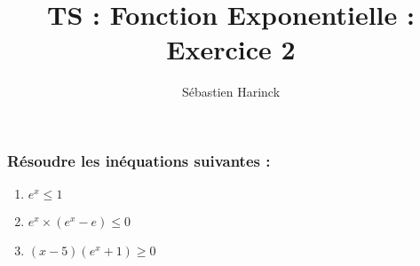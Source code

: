 \documentclass[t]{beamer}
\title{TS : Fonction Exponentielle : Exercice 2}
\author{Sébastien Harinck}
\institute{www.cours-futes.com}
\date{}
\begin{document}
\begin{frame}
\titlepage
\end{frame}

\begin{frame}
\frametitle{Résoudre les inéquations suivantes :}
\begin{enumerate}
\item<+-> \( e^x \leqslant 1\)
\item<+-> \( e^x \times (e^x-e) \leqslant 0\)
\item<+-> \( (x-5)(e^x+1) \geqslant 0\)
\end{enumerate}
\end{frame}
\end{document}
